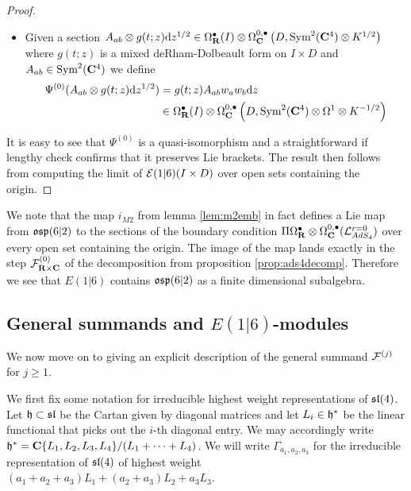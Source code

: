 \documentclass[../main.tex]{subfiles}
\begin{document}
\begin{proof}
\begin{itemize}
\item Given a section 
$A_{ab} \otimes g(t; z)\mathrm{d} z^{1/2} \in \Omega^\bullet_{\mathbf{R}} (I)\otimes \Omega^{0,\bullet}_{\mathbf{C}} \left (D, \text{Sym}^2 (\mathbf{C}^4) \otimes K^{1/2}\right )$ where $g(t;z)$ is a mixed deRham-Dolbeault form on $I\times D$ and $A_{ab} \in \text{Sym}^2 (\mathbf{C}^4)$ we define
\begin{align*}
\Psi^{(0)} (A_{ab} \otimes g(t; z)\mathrm{d} z^{1/2}) &= g(t;z)  A_{ab} w_a w_b \mathrm{d} z \\
&\in \Omega^\bullet_{\mathbf{R}} (I) \otimes \Omega^{0,\bullet}_{\mathbf{C}} \left ( D, \text{Sym}^2 (\mathbf{C}^4) \otimes \Omega^1 \otimes K^{-1/2} \right )
\end{align*}
\end{itemize}
It is easy to see that $\Psi^{(0)}$ is a quasi-isomorphism and a straightforward if lengthy check confirms that it preserves Lie brackets. The result then follows from computing the limit of $\mathcal{E}(1|6)(I\times D)$ over open sets containing the origin. 
\end{proof}

\begin{rmk}
We note that the map $i_{M2}$ from lemma \ref{lem:m2emb} in fact defines a Lie map from $\mathfrak{osp}(6|2)$ to the sections of the boundary condition $\Pi \Omega^\bullet_{\mathbf{R}}\otimes \Omega^{0,\bullet}_{\mathbf{C}} (\mathcal{L}^{r=0}_{AdS_4} )$ over every open set containing the origin. The image of the map lands exactly in the step $\mathcal{F}^{(0)}_{\mathbf{R}\times \mathbf{C}}$ of the decomposition from proposition \ref{prop:ads4decomp}. Therefore we see that $E(1|6)$ contains $\mathfrak{osp}(6|2)$ as a finite dimensional subalgebra.  
\end{rmk}

\subsection{General summands and $E(1|6)$-modules}
We now move on to giving an explicit description of the general summand $\mathcal{F}^{(j)}$ for $j \geq 1$. 

We first fix some notation for irreducible highest weight representations of $\mathfrak{sl}(4)$. Let $\mathfrak{h}\subset \mathfrak{sl}$ be the Cartan given by diagonal matrices and let $L_i\in \mathfrak{h}^*$ be the linear functional that picks out the $i$-th diagonal entry. We may accordingly write $\mathfrak{h}^* = \mathbf{C} \{L_1, L_2, L_3, L_4\}/(L_1+\cdots + L_4)$. We will write $\Gamma_{a_1,a_2, a_3}$ for the irreducible representation of $\mathfrak{sl}(4)$ of highest weight $(a_1+a_2+a_3)L_1+(a_2+a_3)L_2 + a_3L_3$. 
\end{document}
